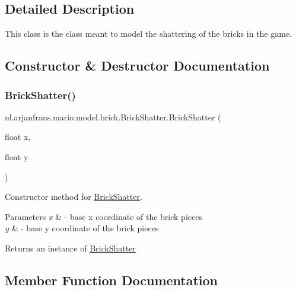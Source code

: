 \subsection{Detailed Description}
This class is the class meant to model the shattering of the bricks in the game. 

\subsection{Constructor \& Destructor Documentation}
\mbox{\label{classnl_1_1arjanfrans_1_1mario_1_1model_1_1brick_1_1BrickShatter_a5ea2c39e2ee5b639935f1a3102f2e4a9}} 
\subsubsection{\texorpdfstring{Brick\+Shatter()}{BrickShatter()}}
{\footnotesize\ttfamily nl.\+arjanfrans.\+mario.\+model.\+brick.\+Brick\+Shatter.\+Brick\+Shatter (\begin{DoxyParamCaption}\item[{float}]{x,  }\item[{float}]{y }\end{DoxyParamCaption})}



Constructor method for \hyperlink{classnl_1_1arjanfrans_1_1mario_1_1model_1_1brick_1_1BrickShatter}{Brick\+Shatter}. 


\begin{DoxyParams}{Parameters}
{\em x} & -\/ base x coordinate of the brick pieces \\
\hline
{\em y} & -\/ base y coordinate of the brick pieces \\
\hline
\end{DoxyParams}
\begin{DoxyReturn}{Returns}
an instance of \hyperlink{classnl_1_1arjanfrans_1_1mario_1_1model_1_1brick_1_1BrickShatter}{Brick\+Shatter} 
\end{DoxyReturn}


\subsection{Member Function Documentation}
\mbox{\label{classnl_1_1arjanfrans_1_1mario_1_1model_1_1brick_1_1BrickShatter_a905743105e75d0c38df647508d51ffa8}} 

